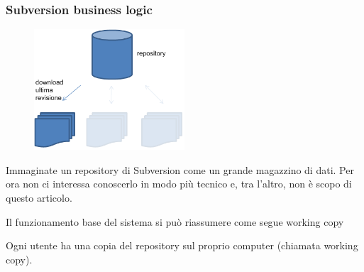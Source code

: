 \documentclass[10pt]{beamer}
\begin{document}
\begin{frame}[fragile]
\frametitle{Subversion business logic}
\begin{figure}[h]
 \centering
 \includegraphics[width=0.5\textwidth]{images/svn-step1.png}
\end{figure}
Immaginate un repository di Subversion come un grande magazzino di dati.
Per ora non ci interessa conoscerlo in modo più tecnico e, tra l’altro, non è scopo di questo articolo.

Il funzionamento base del sistema si può riassumere come segue
working copy

Ogni utente ha una copia del repository sul proprio computer (chiamata working copy).

\end{frame}
\end{document}
